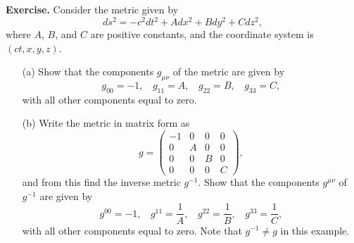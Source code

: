 \par\vspace{\baselineskip}

{\bf Exercise.} Consider the metric given by
\begin{equation}
ds^2=-c^2dt^2+Adx^2+Bdy^2+Cdz^2,
\end{equation}
where $A$, $B$, and $C$ are positive constants, and the coordinate system is $(ct,x,y,z)$.
\begin{itemize}
\item [(a)] Show that the components $g_{\mu\nu}$ of the metric are given by
\begin{equation}
g_{00}=-1,~~~~g_{11}=A,~~~~g_{22}=B,~~~~g_{33}=C,
\end{equation}
with all other components equal to zero.
\item [(b)] Write the metric in matrix form as
\begin{equation}
g=\left( \begin{array}{cccc} -1 & 0 & 0 & 0 \\ 
0 & A & 0 & 0 \\
0 & 0 & B & 0 \\
0 & 0 & 0 & C\end{array} \right),
\end{equation}
and from this find the inverse metric $g^{-1}$. Show that the components $g^{\mu\nu}$ of $g^{-1}$ are given by
\begin{equation}
g^{00}=-1,~~~~g^{11}=\frac{1}{A},~~~~g^{22}=\frac{1}{B},~~~~g^{33}=\frac{1}{C},
\end{equation}
with all other components equal to zero. Note that $g^{-1}\neq g$ in this example.
\end{itemize}

\par\vspace{\baselineskip}

